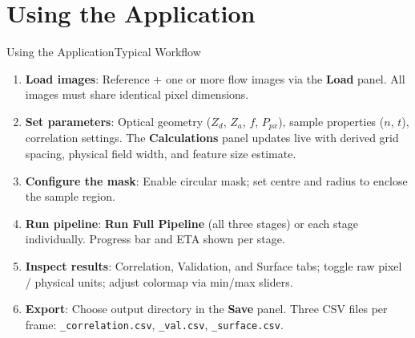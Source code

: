 \documentclass[9pt, aspectratio=169]{beamer}
\begin{document}
\section{Using the Application}

\begin{frame}{Using the Application}{Typical Workflow}
  \begin{enumerate}
    \small
    \item[\textbf{1.}] \textbf{Load images}: Reference + one or more flow images via the \textbf{Load} panel. All images must share identical pixel dimensions.
    \vspace{0.2em}
    \item[\textbf{2.}] \textbf{Set parameters}: Optical geometry ($Z_d$, $Z_a$, $f$, $P_{px}$), sample properties ($n$, $t$), correlation settings. The \textbf{Calculations} panel updates live with derived grid spacing, physical field width, and feature size estimate.
    \vspace{0.2em}
    \item[\textbf{3.}] \textbf{Configure the mask}: Enable circular mask; set centre and radius to enclose the sample region.
    \vspace{0.2em}
    \item[\textbf{4.}] \textbf{Run pipeline}: \textbf{Run Full Pipeline} (all three stages) or each stage individually. Progress bar and ETA shown per stage.
    \vspace{0.2em}
    \item[\textbf{5.}] \textbf{Inspect results}: Correlation, Validation, and Surface tabs; toggle raw pixel / physical units; adjust colormap via min/max sliders.
    \vspace{0.2em}
    \item[\textbf{6.}] \textbf{Export}: Choose output directory in the \textbf{Save} panel. Three CSV files per frame: \texttt{\_correlation.csv}, \texttt{\_val.csv}, \texttt{\_surface.csv}.
  \end{enumerate}
\end{frame}
\end{document}
